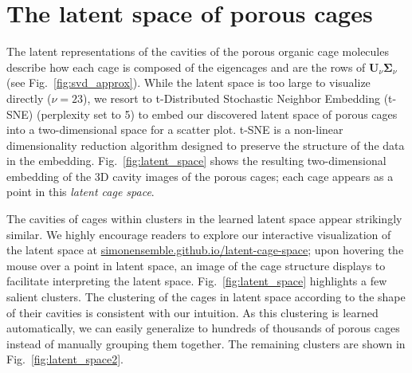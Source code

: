 \documentclass[journal=jacsat,manuscript=article,layout=traditional]{achemso}
\begin{document}
\section{The latent space of porous cages} The latent representations of the cavities of the porous organic cage molecules describe how each cage is composed of the eigencages and are the rows of $\mathbf{U}_\nu \mathbf{\Sigma}_\nu$ (see Fig.~\ref{fig:svd_approx}). While the latent space is too large to visualize directly ($\nu=23$), we resort to t-Distributed Stochastic Neighbor Embedding (t-SNE) \cite{maaten2008visualizing,wattenberg2016how} (perplexity set to 5) to embed our discovered latent space of porous cages into a two-dimensional space for a scatter plot. t-SNE is a non-linear dimensionality reduction algorithm designed to preserve the structure of the data in the embedding. Fig.~\ref{fig:latent_space} shows the resulting two-dimensional embedding of the 3D cavity images of the porous cages; each cage appears as a point in this \emph{latent cage space}. 

The cavities of cages within clusters in the learned latent space appear strikingly similar.
We highly encourage readers to explore our interactive visualization of the latent space at \url{simonensemble.github.io/latent-cage-space}; upon hovering the mouse over a point in latent space, an image of the cage structure displays to facilitate interpreting the latent space. Fig.~\ref{fig:latent_space} highlights a few salient clusters. The clustering of the cages in latent space according to the shape of their cavities is consistent with our intuition. As this clustering is learned automatically, we can easily generalize to hundreds of thousands of porous cages instead of manually grouping them together. The remaining clusters are shown in Fig.~\ref{fig:latent_space2}.
\end{document}
